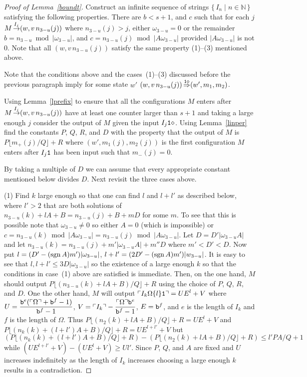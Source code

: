 \documentclass[12pt]{article}
\begin{document}
\begin{proof}[Proof of Lemma~\ref{boundt}]
Construct an infinite sequence of strings $\{\,I_n\mid n\in{\mathbb
  N}\,\}$ satisfying the following properties. There are $b<s+1$, and
$c$ such that for each $j$ $M\mathop{\to}\limits^{I_j}(w,v\,n_{3-u}(j))$ where
$n_{3-u}(j)>j$, either $\omega_{3-u}=0$ or the remainder
$b=n_{3-u}\bmod|\omega_{3-u}|$, and $c=n_{3-u}(j) \bmod
|A\omega_{3-u}|$ provided $|A\omega_{3-u}|$ is not 0. Note that all
$(w,v\,n_{3-u}(j))$ satisfy the same property (1)--(3) mentioned
above.

Note that the conditions above and the cases~(1)--(3) discussed before
the previous paragraph imply for some state $w'$
$(w,v\,n_{3-u}(j))\mathop{\Rightarrow}\limits^{{\tt 1}\diamond}(w', m_1, m_2)$.

Using Lemma~\ref{lprefix} to ensure that all the configurations $M$
enters after $M\mathop{\to}\limits^{I_j}(w,v\,n_{3-u}(j))$ have at least one counter
larger than $s+1$ and taking a large enough $j$ consider the output of
$M$ given the input $I_j{\tt 1}\diamond$. Using Lemma~\ref{linper} find
the constants $P$, $Q$, $R$, and $D$ with the property that the output
of $M$ is $P\lfloor m_+(j)/Q\rfloor +R$ where $(w',m_1(j),m_2(j))$ is
the first configuration $M$ enters after $I_j{\tt 1}$ has been input
such that $m_-(j)=0$.

By taking a multiple of $D$ we can assume that every appropriate
constant mentioned below divides $D$. Next revisit the three cases
above.

(1) Find $k$ large enough so that one can find $l$ and $l+l'$ as
described below, where $l'>2$ that are both solutions of
$n_{3-u}(k)+lA+B=n_{3-u}(j)+B+mD$ for some $m$.  To see that this is
possible note that $\omega_{3-u}\not=0$ so either $A=0$ (which is
impossible) or $c=n_{3-u}(k)\bmod |A\omega_{3-u}|=n_{3-u}(j)\bmod
|A\omega_{3-u}|$.  Let $D=D'|\omega_{3-u}A|$ and let
$n_{3-u}(k)=n_{3-u}(j)+m'|\omega_{3-u}A|+m''D$ where $m'<D'<D$. Now
put $l=(D'-(\mathop{{\rm sgn}} A)m')|\omega_{3-u}|$, $l+l'=(2D'-(\mathop{{\rm sgn}}
A)m')|w_{3-u}|$. It is easy to see that $l,l+l'\leq 3D|\omega_{3-u}|$
so the existence of a large enough $k$ so that the conditions in
case~(1) above are satisfied is immediate.  Then, on the one hand, $M$
should output $P\lfloor (n_{3-u}(k)+lA+B)/Q\rfloor+R$ using the choice
of $P$, $Q$, $R$, and $D$. One the other hand, $M$ will output
$\displaystyle \ulcorner I_k\Omega\{l\}{\tt 1}\urcorner=UE^l+V$ where $\displaystyle
U={{\tt b}^e(\ulcorner\Omega\urcorner+{\tt b}^f-1)\over {\tt b}^f-1}$,
$\displaystyle V=\ulcorner I_k\urcorner-{\ulcorner\Omega\urcorner
  {\tt b}^e\over {\tt b}^f-1}$, $E={\tt b}^f$, and $e$ is the length of $I_k$
and $f$ is the length of $\Omega$. Thus $P\lfloor
(n_2(k)+lA+B)/Q\rfloor+R=UE^l+V$ and $P\lfloor
(n_k(k)+(l+l')A+B)/Q\rfloor+R=UE^{l+l'}+V$ but $(P\lfloor
(n_k(k)+(l+l')A+B)/Q\rfloor+R)-(P\lfloor (n_2(k)+lA+B)/Q\rfloor+R)\leq
l'PA/Q+1$ while $(UE^{l+l'}+V)-(UE^l+V)\geq Ul'$. Since $P$, $Q$, and
$A$ are fixed and $U$ increases indefinitely as the length of $I_k$
increases choosing a large enough $k$ results in a contradiction.


\end{proof}
\end{document}
